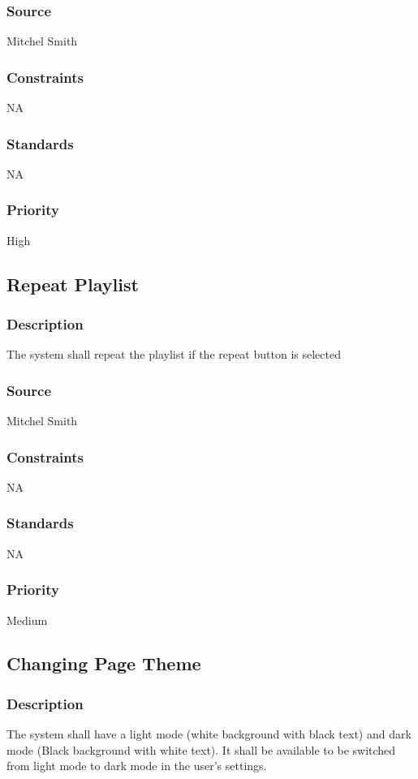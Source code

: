 \subsubsection{Source}
Mitchel Smith
\subsubsection{Constraints}
NA
\subsubsection{Standards}
NA
\subsubsection{Priority}
High

\subsection{Repeat Playlist}
\subsubsection{Description}
The system shall repeat the playlist if the repeat button is selected 
\subsubsection{Source}
Mitchel Smith
\subsubsection{Constraints}
NA
\subsubsection{Standards}
NA
\subsubsection{Priority}
Medium

\subsection{Changing Page Theme}
\subsubsection{Description}
The system shall have a light mode (white background with black text) and dark mode (Black background with white text). It shall be available to be switched from light mode to dark mode in the user's settings.
